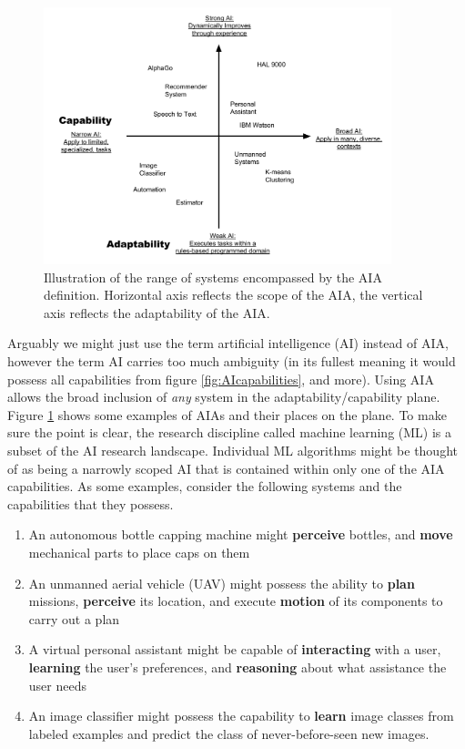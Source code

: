 	\begin{figure}[htbp]
    	\centering
     	\includegraphics[width=0.9\textwidth]{Figures/strong_weak_narrow_broad.pdf}
    	\caption{Illustration of the range of systems encompassed by the AIA definition. Horizontal axis reflects the scope of the AIA, the vertical axis reflects the adaptability of the AIA.}
        \label{fig:StrongWeak}
    \end{figure}

  Arguably we might just use the term artificial intelligence (AI) instead of AIA, however the term AI carries too much ambiguity (in its fullest meaning it would possess all capabilities from figure \ref{fig:AIcapabilities}, and more). Using AIA allows the broad inclusion of \emph{any} system in the adaptability/capability plane. Figure \ref{fig:StrongWeak} shows some examples of AIAs and their places on the plane. To make sure the point is clear, the research discipline called machine learning (ML) is a subset of the AI research landscape. Individual ML algorithms might be thought of as being a narrowly scoped AI that is contained within only one of the AIA capabilities. As some examples, consider the following systems and the capabilities that they possess.

    \begin{enumerate}
         \item An autonomous bottle capping machine might \textbf{perceive} bottles, and \textbf{move} mechanical parts to place caps on them
         \item An unmanned aerial vehicle (UAV) might possess the ability to \textbf{plan} missions, \textbf{perceive} its location, and execute \textbf{motion} of its components to carry out a plan
         \item A virtual personal assistant might be capable of \textbf{interacting} with a user, \textbf{learning} the user's preferences, and \textbf{reasoning} about what assistance the user needs
         \item An image classifier might possess the capability to \textbf{learn} image classes from labeled examples and predict the class of never-before-seen new images.
     \end{enumerate}

